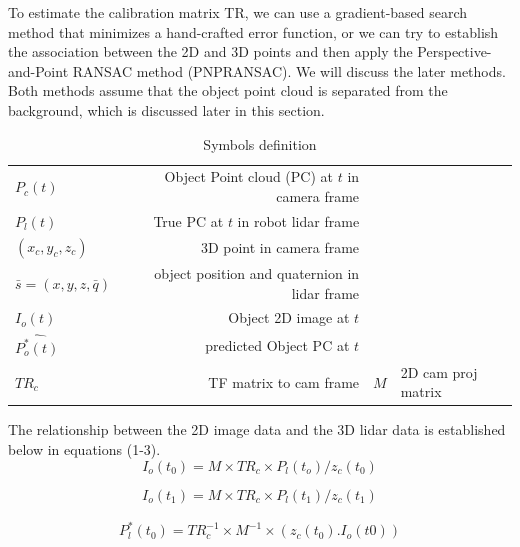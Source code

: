 \documentclass{article}
\begin{document}
To estimate the calibration matrix TR, we can use a gradient-based search method that minimizes a hand-crafted error function, or we can try to establish the association between the 2D and 3D points and then apply the Perspective-and-Point RANSAC method (PNPRANSAC). We will discuss the later methods. Both methods assume that the object point cloud is separated from the background, which is discussed later in this section.
\begin{table}
    \caption{Symbols definition}
    \label{mysymbls}
        \begin{tabularx}{0.9\textwidth}{l | r}
       \toprule
        $P_c(t)$ & Object Point cloud (PC) at $t$ in  camera frame  \\
        $P_l(t)$ & True PC at $t$  in robot lidar frame  \\
        $(x_c, y_c, z_c)$ & 3D point in camera frame \\
        $\bar{s}=(x,y,z, \bar{q}) $ & object position and quaternion in lidar frame \\        \toprule
         $I_o(t)$ & Object 2D image at $t$  \\
        $\hat{P_o^*(t)}$ & predicted Object PC at $t$  \\
        $TR_c$  &  TF matrix to cam frame & $M$ &  2D cam proj matrix \\
         \bottomrule
\end{tabularx}
\end{table}

The relationship between the 2D image data and the 3D lidar data is established below in equations (1-3). 
\begin{equation}\label{eq:i0}
I_o(t_0) = M \times TR_c \times P_l (t_o) / z_c(t_0)
\end{equation}

\begin{equation}\label{eq:i1}
I_o(t_1) = M \times TR_c \times P_l (t_1) / z_c(t_1)
\end{equation}

\begin{eqnarray}\label{eq:i1}
 P_l^*(t_0) = TR_c^{-1} \times M^{-1} \times (z_c(t_0) . I_o(t0)) 
\end{eqnarray}
\end{document}
